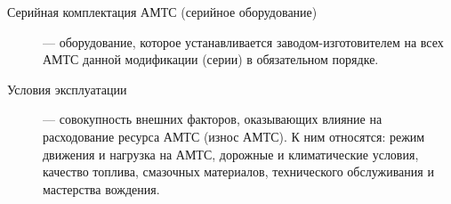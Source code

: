 \begin{description}
	\item[Серийная комплектация  АМТС (серийное оборудование)] --- оборудование, которое устанавливается заводом-изготовителем на всех АМТС данной модификации (серии) в обязательном порядке. 
	
	\item[Условия эксплуатации] --- совокупность внешних факторов, оказывающих влияние на расходование ресурса АМТС (износ АМТС). К ним относятся: режим движения и нагрузка на АМТС, дорожные и климатические условия, качество топлива, смазочных материалов, технического обслуживания и мастерства вождения. 
	

\end{description}
